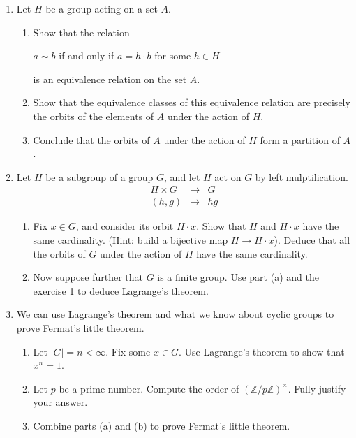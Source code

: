 \documentclass[11pt]{article}
\newcommand{\bZ}{\mathbb{Z}}
\begin{document}
\begin{enumerate}
  \item Let $H$ be a group acting on a set $A$.
  \begin{enumerate}
    \item Show that the relation
    \begin{center}
      $a\sim b$ if and only if $a = h\cdot b$ for some $h\in H$
    \end{center}
    is an equivalence relation on the set $A$.
    \item Show that the equivalence classes of this equivalence relation are precisely the orbits of the elements of $A$ under the action of $H$.
    \item Conclude that the orbits of $A$ under the action of $H$ form a partition of $A$.
  \end{enumerate}
  \item Let $H$ be a subgroup of a group $G$, and let $H$ act on $G$ by left mulptilication.
  \begin{eqnarray*}
    H\times G &\to& G\\
    (h,g) &\mapsto& hg
  \end{eqnarray*}
  \begin{enumerate}
    \item Fix $x\in G$, and consider its orbit $H\cdot x$. Show that $H$ and $H\cdot x$ have the same cardinality.  (Hint: build a bijective map $H\to H\cdot x$).  Deduce that all the orbits of $G$ under the action of $H$ have the same cardinality.
    \item Now suppose further that $G$ is a finite group.  Use part (a) and the exercise 1 to deduce Lagrange's theorem.
  \end{enumerate}
  \item We can use Lagrange's theorem and what we know about cyclic groups to prove Fermat's little theorem.
  \begin{enumerate}
    \item Let $|G|=n<\infty$.  Fix some $x\in G$.  Use Lagrange's theorem to show that $x^n = 1$.
    \item Let $p$ be a prime number.  Compute the order of $(\bZ/p\bZ)^\times$.  Fully justify your answer.
    \item Combine parts (a) and (b) to prove Fermat's little theorem.
  \end{enumerate}
\end{enumerate}
\end{document}
